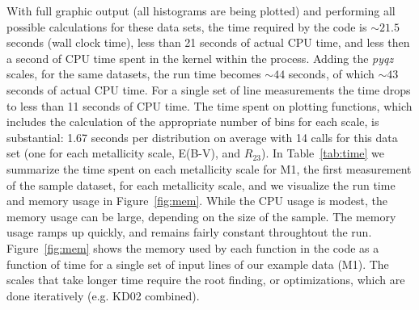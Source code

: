 \documentclass{emulateapj}
\begin{document}
With full graphic output (all histograms are being plotted) and performing all possible calculations for these data sets, the time required by the code is $\sim21.5$ seconds (wall clock time), less than 21 seconds of actual CPU time, and less then a second of CPU time spent in the kernel within the process. Adding the \emph{pyqz} scales, for the same datasets, the run time becomes $\sim44$ seconds, of which $\sim43$ seconds of actual CPU time. For a single set of line measurements the time drops to less than 11 seconds of CPU time. 
The time spent on plotting functions, which includes the calculation of the appropriate number of bins for each scale, is substantial: 1.67 seconds per distribution  on average with 14 calls for this data set (one for each metallicity scale, E(B-V), and $R_{23}$). In Table~\ref{tab:time}  we summarize the time spent on each metallicity scale for M1, the first  measurement of the sample dataset, for each metallicity scale, and we visualize the run time and memory usage in Figure~\ref{fig:mem}. While the CPU usage is modest, the memory usage can be large, depending on the size of the sample.  The memory usage ramps up quickly, and remains fairly constant throughtout the run.  Figure~\ref{fig:mem} shows the memory used by each function in the code as a function of time for a single set of input lines of our example data (M1). The scales that take longer time require the root finding, or optimizations, which are done iteratively (e.g. KD02 combined).
\end{document}
